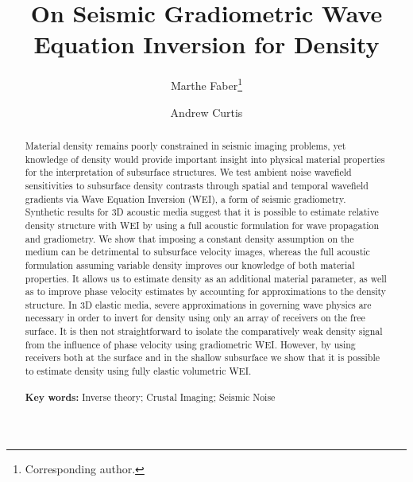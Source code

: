 \documentclass{article} %
\title{On Seismic Gradiometric Wave Equation Inversion for Density}
\author[]{ \large Marthe Faber\thanks{Corresponding author.} }
\author[]{ \large Andrew Curtis}
\affil[]{\small University of Edinburgh, School of Geosciences, Edinburgh, UK \linebreak \linebreak
		 \textit{E-mails}: M.Faber@sms.ed.ac.uk (M.Faber), Andrew.Curtis@ed.ac.uk (A.Curtis)}
\date{}
\providecommand{\keywords}[1]
{
	\small	
	\textbf{\textbf{Key words:}} #1
}
\providecommand{\DIFaddtex}[1]{{\protect\color{blue}\uwave{#1}}} %
\providecommand{\DIFaddbegin}{} %
\providecommand{\DIFaddend}{} %
\providecommand{\DIFdelbegin}{} %
\providecommand{\DIFdelend}{} %
\providecommand{\DIFadd}[1]{\texorpdfstring{\DIFaddtex{#1}}{#1}} %
\newcommand{\DIFscaledelfig}{0.5}
\newlength{\DIFdelgraphicswidth} %
\newlength{\DIFdelgraphicsheight} %
\newcommand{\DIFaddincludegraphics}[2][]{{\color{blue}\fbox{\DIFOincludegraphics[#1]{#2}}}} %
\newcommand{\DIFdelincludegraphics}[2][]{%
\sbox{\DIFdelgraphicsbox}{\DIFOincludegraphics[#1]{#2}}%
\settoboxwidth{\DIFdelgraphicswidth}{\DIFdelgraphicsbox} %
\settoboxtotalheight{\DIFdelgraphicsheight}{\DIFdelgraphicsbox} %
\scalebox{\DIFscaledelfig}{%
\parbox[b]{\DIFdelgraphicswidth}{\usebox{\DIFdelgraphicsbox}\\[-\baselineskip] \rule{\DIFdelgraphicswidth}{0em}}\llap{\resizebox{\DIFdelgraphicswidth}{\DIFdelgraphicsheight}{%
\setlength{\unitlength}{\DIFdelgraphicswidth}%
\begin{picture}(1,1)%
\thicklines\linethickness{2pt} %
{\color[rgb]{1,0,0}\put(0,0){\framebox(1,1){}}}%
{\color[rgb]{1,0,0}\put(0,0){\line( 1,1){1}}}%
{\color[rgb]{1,0,0}\put(0,1){\line(1,-1){1}}}%
\end{picture}%
}\hspace*{3pt}}} %
} %
\DeclareRobustCommand{\DIFaddbegin}{\DIFOaddbegin \let\includegraphics\DIFaddincludegraphics} %
\DeclareRobustCommand{\DIFaddend}{\DIFOaddend \let\includegraphics\DIFOincludegraphics} %
\DeclareRobustCommand{\DIFdelbegin}{\DIFOdelbegin \let\includegraphics\DIFdelincludegraphics} %
\DeclareRobustCommand{\DIFdelend}{\DIFOaddend \let\includegraphics\DIFOincludegraphics} %
\begin{document}
	\captionsetup[subfigure]{position=top, labelfont=bf,textfont=normalfont,singlelinecheck=off,justification=raggedright}
	\maketitle

	\begin{abstract}
		\noindent%
		Material density remains poorly constrained in seismic imaging problems, yet knowledge of density would provide important insight into physical material properties for the interpretation of subsurface structures. We test ambient noise wavefield sensitivities to subsurface density contrasts through spatial and temporal wavefield gradients via Wave Equation Inversion (WEI), a form of seismic gradiometry. Synthetic results for 3D acoustic media suggest that it is possible to estimate relative density structure with WEI by using a full acoustic formulation for wave propagation and gradiometry. We show that imposing a constant density assumption on the medium can be detrimental to subsurface velocity images, whereas the full acoustic formulation assuming variable density improves our knowledge of both material properties. It allows us to estimate density as an additional material parameter, as well as to improve phase velocity estimates by accounting for approximations to the density structure. In 3D elastic media, severe approximations in \DIFaddbegin \DIFadd{the }\DIFaddend governing wave physics are necessary in order to invert for density using only an array of receivers on the free surface. It is then not straightforward to isolate the comparatively weak density signal from the influence of phase velocity using gradiometric WEI. However, by using receivers both at the surface and in the shallow subsurface we show that it is possible to estimate density using fully elastic volumetric WEI. \\ \\%
		\DIFdelbegin %
\DIFdelend \DIFaddbegin \keywords{Inverse theory; Crustal Imaging; Seismic Noise} %
	\DIFaddend \end{abstract}
\end{document}
